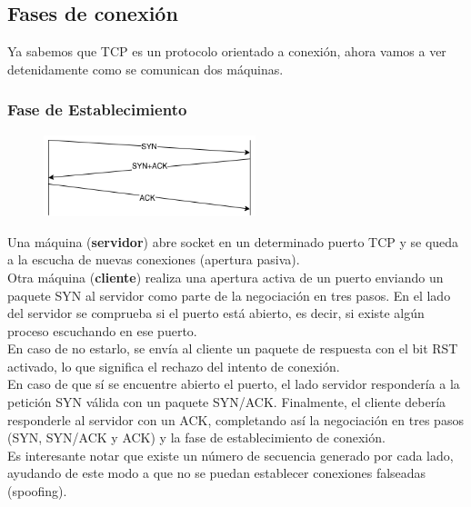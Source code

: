 \begin{onepage}

\subsection{Fases de conexión}
Ya sabemos que TCP es un protocolo orientado a conexión, ahora vamos a ver detenidamente como se comunican dos máquinas.
\subsubsection{Fase de Establecimiento}
\begin{figure}[H]
    \centering
    \includegraphics[width=0.55\textwidth]{img/SYN3.png}
\end{figure}
Una máquina (\textbf{servidor}) abre socket en un determinado puerto TCP y se queda a la escucha de nuevas conexiones (apertura pasiva).\\

Otra máquina (\textbf{cliente}) realiza una apertura activa de un puerto enviando un paquete SYN al servidor como parte de la negociación en tres pasos. En el lado del servidor se comprueba si el puerto está abierto, es decir, si existe algún proceso escuchando en ese puerto.\\

En caso de no estarlo, se envía al cliente un paquete de respuesta con el bit RST activado, lo que significa el rechazo del intento de conexión.\\

En caso de que sí se encuentre abierto el puerto, el lado servidor respondería a la petición SYN válida con un paquete SYN/ACK. Finalmente, el cliente debería responderle al servidor con un ACK, completando así la negociación en tres pasos (SYN, SYN/ACK y ACK) y la fase de establecimiento de conexión.\\

Es interesante notar que existe un número de secuencia generado por cada lado, ayudando de este modo a que no se puedan establecer conexiones falseadas (spoofing).\\


\end{onepage}
